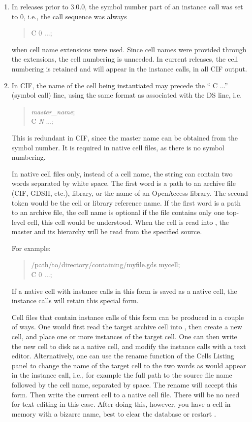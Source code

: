 \begin{enumerate}
\item In {\Xic} releases prior to 3.0.0, the symbol number part of
an instance call was set to 0, i.e., the call sequence was always
\begin{quote}
{\vt C 0} ...{\vt ;}
\end{quote}
when cell name extensions were used.  Since cell names were provided
through the extensions, the cell numbering is unneeded.  In current
releases, the cell numbering is retained and will appear in the
instance calls, in all CIF output.

\item In CIF, the name of the cell being instantiated may precede the ``{\vt
C ...}'' (symbol call) line, using the same format as associated with
the {\vt DS} line, i.e.
\begin{quote}
{} {\it master\_name\/}{\vt ;}\\
{\vt C} {\it N} {\vt ...;}
\end{quote}
This is redundant in CIF, since the master name can be obtained from
the symbol number.  It is required in native cell files, as there is
no symbol numbering.

In native cell files only, instead of a cell name, the string can
contain two words separated by white space.  The first word is a path
to an archive
file (CIF, GDSII, etc.), library, or the name of an
OpenAccess library.
The second token would be the cell or library reference name.  If the
first word is a path to an archive file, the cell name is optional if
the file contains only one top-level cell, this cell would be
understood.  When the cell is read into {\Xic}, the master and its
hierarchy will be read from the specified source.

For example:
\begin{quote}
{ /path/to/directory/containing/myfile.gds mycell;}\\
{\vt C 0 ...;}\\
\end{quote}

If a native cell with instance calls in this form is saved as a native
cell, the instance calls will retain this special form.

Cell files that contain instance calls of this form can be produced in
a couple of ways.  One would first read the target archive cell into
{\Xic}, then create a new cell, and place one or more instances of the
target cell.  One can then write the new cell to disk as a native
cell, and modify the instance calls with a text editor. 
Alternatively, one can use the rename function of the {\cb Cells
Listing} panel to change the name of the target cell to the two words
as would appear in the instance call, i.e., for example the full path
to the source file name followed by the cell name, separated by space. 
The rename will accept this form.  Then write the current cell to a
native cell file.  There will be no need for text editing in this
case.  After doing this, however, you have a cell in memory with a
bizarre name, best to clear the database or restart {\Xic}.


\end{enumerate}
